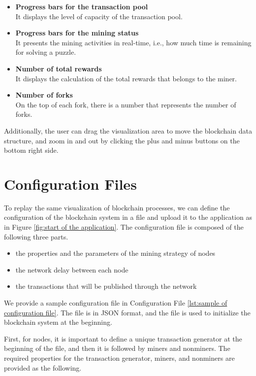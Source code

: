 \begin{itemize}
    \item \textbf{Progress bars for the transaction pool} \\
        It displays the level of capacity of the transaction pool.
    \item \textbf{Progress bars for the mining status} \\
        It presents the mining activities in real-time, i.e., how much time is remaining for solving a puzzle.
    \item \textbf{Number of total rewards} \\
        It displays the calculation of the total rewards that belongs to the miner.
    \item \textbf{Number of forks} \\
        On the top of each fork, there is a number that represents the number of forks.
\end{itemize}

Additionally, the user can drag the visualization area to move the blockchain data structure, and zoom in and out by clicking the plus and minus buttons on the bottom right side.

\section{Configuration Files}

To replay the same visualization of blockchain processes, we can define the configuration of the blockchain system in a file and upload it to the application as in Figure \ref{fig:start of the application}. The configuration file is composed of the following three parts.

\begin{itemize}
    \item the properties and the parameters of the mining strategy of nodes
    \item the network delay between each node
    \item the transactions that will be published through the network
\end{itemize}

We provide a sample configuration file in Configuration File \ref{lst:sample of configuration file}. The file is in JSON format, and the file is used to initialize the blockchain system at the beginning.

First, for nodes, it is important to define a unique transaction generator at the beginning of the file, and then it is followed by miners and nonminers. The required properties for the transaction generator, miners, and nonminers are provided as the following.

